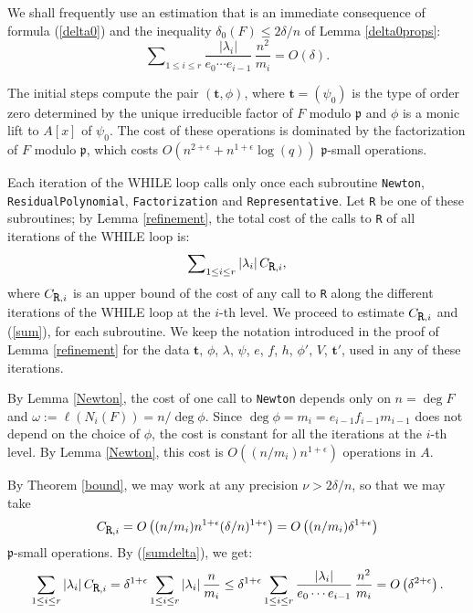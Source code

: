 \documentclass{amsart}
\begin{document}
We shall frequently use an estimation that is an immediate consequence of formula (\ref{delta0}) and the inequality $\delta_0(F)\le 2\delta/n$ of Lemma \ref{delta0props}:
\begin{equation}\label{sumdelta}
 \sum\nolimits_{1\le i\le r}\dfrac{|\lambda_i|}{e_0\cdots e_{i-1}}\,\dfrac{n^2}{m_i}=O(\delta).
\end{equation}
 
The initial steps compute the pair $({\mathbf{t}},\phi)$, where ${\mathbf{t}}=(\psi_0)$ is the type of order zero determined by the unique irreducible factor of $F$ modulo ${\mathfrak{p}}$ and $\phi$ is a monic lift to $A[x]$ of $\psi_0$. The cost of these operations is dominated by the factorization of $F$ modulo ${\mathfrak{p}}$, which costs $O\left(n^{2+\epsilon}+n^{1+\epsilon}\log(q)\right)$ ${\mathfrak{p}}$-small operations. 

Each iteration of the WHILE loop calls only once each subroutine {\tt Newton}, {\tt ResidualPolynomial}, {\tt Factorization} and {\tt Representative}. Let {\tt R} be one of these subroutines; by Lemma \ref{refinement}, the total cost of the calls to {\tt R} of all iterations of the WHILE loop is:
\begin{equation}\label{sum}
\sum\nolimits_{1\le i\le r}|\lambda_i|\,C_{\mbox{\tt R},i},
\end{equation}
where $C_{\mbox{\tt R},i}$ is an upper bound of the cost of any call to {\tt R} along the different iterations of the WHILE loop at the $i$-th level. We proceed to estimate 
$C_{\mbox{\tt R},i}$ and (\ref{sum}), for each subroutine. We keep the notation introduced in the proof of Lemma \ref{refinement} for the data ${\mathbf{t}}$, $\phi$, $\lambda$, $\psi$, $e$, $f$, $h$, $\phi'$, $V$, ${\mathbf{t}}'$, used in any of these iterations.\medskip

By Lemma \ref{Newton}, the cost of one call to {\tt Newton}  depends only on $n=\deg F$ and $\omega:=\ell(N_i(F))=n/\deg\phi$. Since $\deg\phi=m_i=e_{i-1}f_{i-1}m_{i-1}$ does not depend on the choice of $\phi$, the cost  is constant for all the iterations at the $i$-th level. By Lemma \ref{Newton}, this cost is $O\left((n/m_i)n^{1+\epsilon}\right)$ operations in $A$. 

By Theorem \ref{bound}, we may work at any precision $\nu>2\delta/n$, so that we may take 
$$
C_{\mbox{\tt R},i}=O\left((n/m_i)n^{1+\epsilon}(\delta/n)^{1+\epsilon}\right)=
O\left((n/m_i)\delta^{1+\epsilon}\right)
$$
${\mathfrak{p}}$-small operations. By (\ref{sumdelta}), we get:
$$
\sum_{1\le i\le r}|\lambda_i|\,C_{\mbox{\tt R},i}=
\delta^{1+\epsilon}\sum_{1\le i\le r}|\lambda_i|\,\dfrac{n}{m_i}\le 
\delta^{1+\epsilon}\sum_{1\le i\le r}\dfrac{|\lambda_i|}{e_0\cdots e_{i-1}}\,\dfrac{n^2}{m_i}=O\left(\delta^{2+\epsilon}\right).
$$
\end{document}
